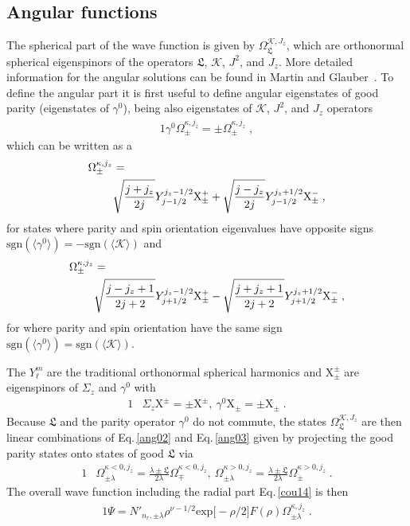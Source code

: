 \documentclass[epj]{svjour}
\begin{document}
\subsection{Angular functions} \label{ang}
The spherical part of the wave function is given by $\Omega_{\mathfrak{L}}^{\mathcal{K},J_{z}}$, which are orthonormal spherical eigenspinors of the operators $\mathfrak{L}$, $\mathcal{K}$, $J^{2}$, and $J_{z}$. More detailed information for the angular solutions can be found in Martin and Glauber~\cite{Martin:1958zz}. To define the angular part it is first useful to define angular eigenstates of good parity (eigenstates of $\gamma^{0}$), being also eigenstates of $\mathcal{K}$, $J^{2}$, and $J_{z}$ operators
\begin{alignat}{1}
\label{ang01} \gamma^{0}\Omega_{\pm}^{\kappa,j_{z}}=\pm\Omega_{\pm}^{\kappa,j_{z}}\;,\end{alignat}
which can be written as a
\begin{alignat}{1}
\label{ang02} \Omega_{\pm}^{\kappa,j_{z}}&=\\ \notag&\sqrt{\frac{j+j_{z}}{2j}}Y^{j_{z}-1/2}_{j-1/2}\mathrm{X}^{+}_{\pm}+\sqrt{\frac{j-j_{z}}{2j}}Y^{j_{z}+1/2}_{j-1/2}\mathrm{X}^{-}_{\pm}\;,
\end{alignat}
for states where parity and spin orientation eigenvalues have opposite signs $\mathrm{sgn}(\langle\gamma^{0}\rangle)=-\mathrm{sgn}(\langle\mathcal{K}\rangle)$ and
\begin{alignat}{1}
\label{ang03} \Omega_{\pm}^{\kappa,j_{z}}&=\\ \notag&\sqrt{\frac{j-j_{z}+1}{2j+2}}Y^{j_{z}-1/2}_{j+1/2}\mathrm{X}^{+}_{\pm}-\sqrt{\frac{j+j_{z}+1}{2j+2}}Y^{j_{z}+1/2}_{j+1/2}\mathrm{X}^{-}_{\pm}\;,
\end{alignat}
for where parity and spin orientation have the same sign $\mathrm{sgn}(\langle\gamma^{0}\rangle)=\mathrm{sgn}(\langle\mathcal{K}\rangle)$.

The $Y^{m}_{\ell}$ are the traditional orthonormal spherical harmonics and $\mathrm{X}^{\pm}_{\pm}$ are eigenspinors of $\Sigma_{z}$ and $\gamma^{0}$ with
\begin{alignat}{1}
\label{ang04} &\Sigma_{z}\mathrm{X}^{\pm}=\pm\mathrm{X}^{\pm},\ \gamma^{0}\mathrm{X}_{\pm}=\pm\mathrm{X}_{\pm}\;.
\end{alignat}
Because $\mathfrak{L}$ and the parity operator $\gamma^{0}$ do not commute, the states $\Omega_{\mathfrak{L}}^{\mathcal{K},J_{z}}$ are then linear combinations of Eq.\,\eqref{ang02} and Eq.\,\eqref{ang03} given by projecting the good parity states onto states of good $\mathfrak{L}$ via
\begin{alignat}{1}
\label{ang04} &\Omega_{\pm\lambda}^{\kappa<0,j_{z}}=\frac{\lambda\pm\mathfrak{L}}{2\lambda}\Omega_{\mp}^{\kappa<0,j_{z}},\ \Omega_{\pm\lambda}^{\kappa>0,j_{z}}=\frac{\lambda\pm\mathfrak{L}}{2\lambda}\Omega_{\pm}^{\kappa>0,j_{z}}\;.
\end{alignat}
The overall wave function including the radial part Eq.\,\eqref{cou14} is then
\begin{alignat}{1}
\label{ang05} \Psi=N'_{n_{r},\pm\lambda}\rho^{\nu-1/2}\mathrm{exp}\Big[-\rho/2\Big]F(\rho)\Omega_{\pm\lambda}^{\kappa,j_{z}}\;.
\end{alignat}
\end{document}
